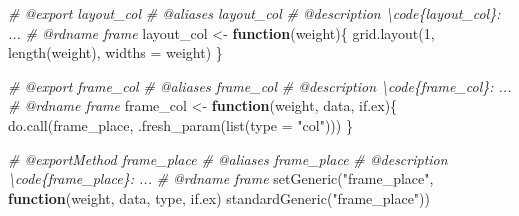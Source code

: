 \documentclass[
]{article}
\newenvironment{Shaded}{\begin{snugshade}}{\end{snugshade}}
\newcommand{\AttributeTok}[1]{\textcolor[rgb]{0.77,0.63,0.00}{#1}}
\newcommand{\CommentTok}[1]{\textcolor[rgb]{0.56,0.35,0.01}{\textit{#1}}}
\newcommand{\ControlFlowTok}[1]{\textcolor[rgb]{0.13,0.29,0.53}{\textbf{#1}}}
\newcommand{\DecValTok}[1]{\textcolor[rgb]{0.00,0.00,0.81}{#1}}
\newcommand{\FunctionTok}[1]{\textcolor[rgb]{0.00,0.00,0.00}{#1}}
\newcommand{\NormalTok}[1]{#1}
\newcommand{\OtherTok}[1]{\textcolor[rgb]{0.56,0.35,0.01}{#1}}
\newcommand{\StringTok}[1]{\textcolor[rgb]{0.31,0.60,0.02}{#1}}
\begin{document}
\begin{Shaded}
\begin{Highlighting}[]
\CommentTok{\#\textquotesingle{} @export layout\_col}
\CommentTok{\#\textquotesingle{} @aliases layout\_col}
\CommentTok{\#\textquotesingle{} @description \textbackslash{}code\{layout\_col\}: ...}
\CommentTok{\#\textquotesingle{} @rdname frame}
\NormalTok{layout\_col }\OtherTok{\textless{}{-}} \ControlFlowTok{function}\NormalTok{(weight)\{}
  \FunctionTok{grid.layout}\NormalTok{(}\DecValTok{1}\NormalTok{, }\FunctionTok{length}\NormalTok{(weight), }\AttributeTok{widths =}\NormalTok{ weight)}
\NormalTok{\}}

\CommentTok{\#\textquotesingle{} @export frame\_col}
\CommentTok{\#\textquotesingle{} @aliases frame\_col}
\CommentTok{\#\textquotesingle{} @description \textbackslash{}code\{frame\_col\}: ...}
\CommentTok{\#\textquotesingle{} @rdname frame}
\NormalTok{frame\_col }\OtherTok{\textless{}{-}} \ControlFlowTok{function}\NormalTok{(weight, data, if.ex)\{}
  \FunctionTok{do.call}\NormalTok{(frame\_place, }\FunctionTok{.fresh\_param}\NormalTok{(}\FunctionTok{list}\NormalTok{(}\AttributeTok{type =} \StringTok{"col"}\NormalTok{)))}
\NormalTok{\}}

\CommentTok{\#\textquotesingle{} @exportMethod frame\_place}
\CommentTok{\#\textquotesingle{} @aliases frame\_place}
\CommentTok{\#\textquotesingle{} @description \textbackslash{}code\{frame\_place\}: ...}
\CommentTok{\#\textquotesingle{} @rdname frame}
\FunctionTok{setGeneric}\NormalTok{(}\StringTok{"frame\_place"}\NormalTok{, }
  \ControlFlowTok{function}\NormalTok{(weight, data, type, if.ex) }
    \FunctionTok{standardGeneric}\NormalTok{(}\StringTok{"frame\_place"}\NormalTok{))}


\end{Highlighting}
\end{Shaded}
\end{document}
